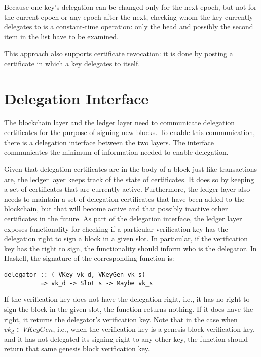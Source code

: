 \documentclass[11pt,a4paper]{article}
\begin{document}
Because one key's delegation can be changed only for the next epoch, but
not for the current epoch or any epoch after the next, checking whom the key
currently delegates to is a constant-time operation: only the head and
possibly the second item in the list have to be examined.

This approach also supports certificate revocation: it is done by posting a
certificate in which a key delegates to itself.


\section{Delegation Interface}
\label{sec:del-interface}

The blockchain layer and the ledger layer need to communicate delegation
certificates for the purpose of signing new blocks.
%
To enable this communication, there is a delegation interface between the two
layers.
%
The interface communicates the minimum of information needed to enable
delegation.


Given that delegation certificates are in the body of a block just like
transactions are, the ledger layer keeps track of the state of certificates.
%
It does so by keeping a set of certificates that are currently active.
%
Furthermore, the ledger layer also needs to maintain a set of delegation
certificates that have been added to the blockchain, but that will become
active and that possibly inactive other certificates in the future.
%
As part of the delegation interface, the ledger layer exposes functionality
for checking if a particular verification key has the delegation right to sign
a block in a given slot.
%
In particular, if the verification key has the right to sign, the
functionality should inform who is the delegator.
%
In Haskell, the signature of the corresponding function is:
%
\begin{lstlisting}
delegator :: ( VKey vk_d, VKeyGen vk_s)
          => vk_d -> Slot s -> Maybe vk_s
\end{lstlisting}

If the verification key does not have the delegation right, i.e., it has no
right to sign the block in the given slot, the function returns nothing.
%
If it does have the right, it returns the delegator's verification key.
%
Note that in the case when $vk_d \in VKeyGen$, i.e., when the verification key
is a genesis block verification key, and it has not delegated its signing
right to any other key, the function should return that same genesis block
verification key.
\end{document}

